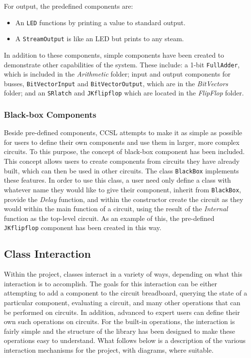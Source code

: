 \documentclass{article}
\newcommand{\Italics}[1]{\textit{#1}}
\newcommand{\ClassName}[1]{\texttt{#1}}
\newcommand{\FunctionName}[1]{\textit{#1}}
\begin{document}
For output, the predefined components are:

\begin{itemize}

\item An \ClassName{LED} functions by printing a value to standard output.

\item A \ClassName{StreamOutput} is like an LED but prints to any steam.

\end{itemize}

In addition to these components, simple components have been created to demonstrate other capabilities of the system. These include: a 1-bit \ClassName{FullAdder}, which is included in the \Italics{Arithmetic} folder; input and output components for busses, \ClassName{BitVectorInput} and \ClassName{BitVectorOutput}, which are in the \Italics{BitVectors} folder; and an \ClassName{SRlatch} and \ClassName{JKflipflop} which are located in the \Italics{FlipFlop} folder.

\subsubsection{Black-box Components}

Beside pre-defined components, CCSL attempts to make it as simple as possible for users to define their own components and use them in larger, more complex circuits. To this purpose, the concept of black-box component has been included. This concept allows users to create components from circuits they have already built, which can then be used in other circuits. The class \ClassName{BlackBox} implements these features. In order to use this class, a user need only define a class with whatever name they would like to give their component, inherit from \ClassName{BlackBox}, provide the \FunctionName{Delay} function, and within the constructor create the circuit as they would within the main function of a circuit, using the result of the \FunctionName{Internal} function as the top-level circuit. As an example of this, the pre-defined \ClassName{JKflipflop} component has been created in this way.

\subsection{Class Interaction}

Within the project, classes interact in a variety of ways, depending on what this interaction is to accomplish. The goals for this interaction can be either attempting to add a component to the circuit breadboard, querying the state of a particular component, evaluating a circuit, and many other operations that can be performed on circuits. In addition, advanced to expert users can define their own such operations on circuits. For the built-in operations, the interaction is fairly simple and the structure of the library has been designed to make these operations easy to understand. What follows below is a description of the various interaction mechanisms for the project, with diagrams, where suitable.
\end{document}
